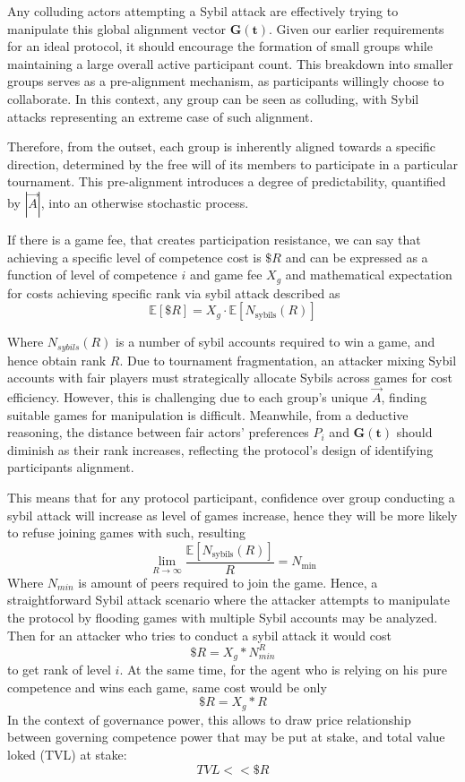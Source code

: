 \documentclass{article}
\begin{document}
\begin{CJK}{UTF8}{gbsn}
\begin{multicols}{2}
        Any colluding actors attempting a Sybil attack are effectively trying to manipulate this global alignment vector $\mathbf{G(t)}$. Given our earlier requirements for an ideal protocol, it should encourage the formation of small groups while maintaining a large overall active participant count. This breakdown into smaller groups serves as a pre-alignment mechanism, as participants willingly choose to collaborate. In this context, any group can be seen as colluding, with Sybil attacks representing an extreme case of such alignment.

        Therefore, from the outset, each group is inherently aligned towards a specific direction, determined by the free will of its members to participate in a particular tournament. This pre-alignment introduces a degree of predictability, quantified by $|\vec{A}|$, into an otherwise stochastic process.


        If there is a game fee, that creates participation resistance, we can say that achieving a specific level of competence cost is $\$R$ and can be expressed as a function of level of competence $i$ and game fee $X_g$ and mathematical expectation for costs achieving specific rank via sybil attack described as
            \begin{equation}
                \mathbb{E}[\$R] = X_g \cdot \mathbb{E}[N_{\text{sybils}}(R)]
            \end{equation}


            Where $N_{sybils}(R)$ is a number of sybil accounts required to win a game, and hence obtain rank $R$. Due to tournament fragmentation, an attacker mixing Sybil accounts with fair players must strategically allocate Sybils across games for cost efficiency. However, this is challenging due to each group's unique $\vec{A}$, finding suitable games for manipulation is difficult.  Meanwhile, from a deductive reasoning, the distance between fair actors' preferences $P_i$ and $\mathbf{G(t)}$ should diminish as their rank increases, reflecting the protocol's design of identifying participants alignment.


        This means that for any protocol participant, confidence over group conducting a sybil attack will increase as level of games increase, hence they will be more likely to refuse joining games with such, resulting $$\lim_{R \to \infty} \frac{\mathbb{E}[N_{\text{sybils}}(R)]}{R} = N_{\text{min}}$$ Where $N_{min}$ is amount of peers required to join the game. Hence, a straightforward Sybil attack scenario where the attacker attempts to manipulate the protocol by flooding games with multiple Sybil accounts may be analyzed.
        Then for an attacker who tries to conduct a sybil attack it would cost
        $$\$R = X_g*N_{min}^R$$ to get rank of level $i$. At the same time, for the agent who is relying on his pure competence and wins each game, same cost would be only $$\$R = X_g*R$$
        In the context of governance power, this allows to draw price relationship between governing competence power that may be put at stake, and total value loked (TVL) at stake: $$TVL << \$R$$



\end{multicols}
\end{CJK}
\end{document}
